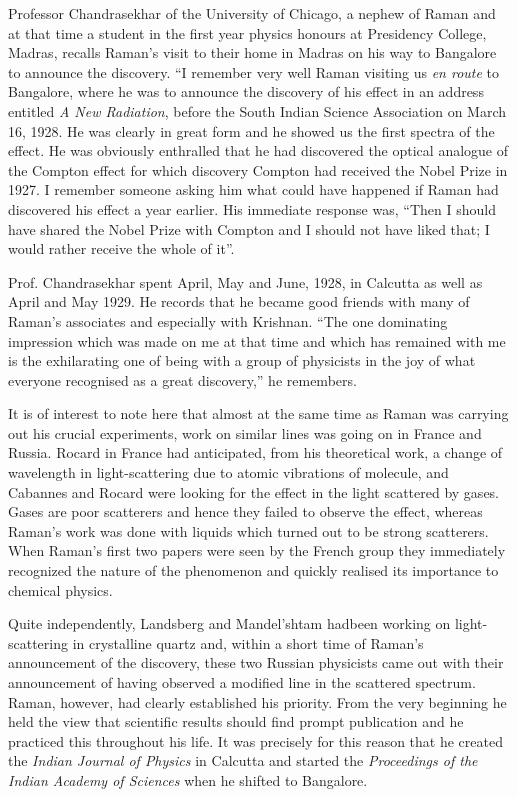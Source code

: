 Professor Chandrasekhar of the University of Chicago, a
nephew of Raman and at that time a student in the first year
physics honours at Presidency College, Madras, recalls Raman's
visit to their home in Madras on his way to Bangalore to announce
the discovery. ``I remember very well Raman visiting us {\em en route}
to Bangalore, where he was to announce the discovery of his effect
in an address entitled {\em A New Radiation}, before the South Indian
Science Association on March 16, 1928. He was clearly in great
form and he showed us the first spectra of the effect. He was
obviously enthralled that he had discovered the optical analogue
of the Compton effect for which discovery Compton had received
the Nobel Prize in 1927. I remember someone asking him what
could have happened if Raman had discovered his effect a year
earlier. His immediate response was, ``Then I should have shared
the Nobel Prize with Compton and I should not have liked that;
I would rather receive the whole of it''.

Prof. Chandrasekhar spent April, May and June, 1928, in
Calcutta as well as April and May 1929. He records that he
became good friends with many of Raman's associates and
especially with \hbox{Krishnan}. ``The one dominating impression
which was made on me at that time and which has remained with
me is the exhilarating one of being with a group of physicists
in the joy of what everyone recognised as a great discovery,''
he remembers.

It is of interest to note here that almost at the same time
as \hbox{Raman} was carrying out his crucial experiments, work on
similar lines was going on in France and Russia. Rocard in France
had anticipated, from his theoretical work, a change of wavelength 
in light-scattering due to atomic vibrations of molecule,
and Cabannes and Rocard were looking for the effect in the light
scattered by gases. Gases are poor scatterers and hence they failed
to observe the effect, whereas \hbox{Raman's} work was done with
liquids which turned out to be strong scatterers. When Raman's
first two papers were seen by the French group they immediately
recognized the nature of the phenomenon and quickly realised
its importance to chemical physics.

Quite independently, Landsberg and Mandel'shtam had\break been
working on light-scattering in crystalline quartz and, with\-in a
short time of Raman's announcement of the discovery, these two
Russian physicists came out with their announcement of having
observed a modified line in the scattered spectrum. Raman,
however, had clearly established his priority. From the very
beginning he held the view that scientific results should find
prompt publication and he practiced this throughout his life.
It was precisely for this reason that he created the {\em Indian Journal
of Physics} in Calcutta and started the {\em Proceedings of the Indian Academy of Sciences} when he shifted to Bangalore.

